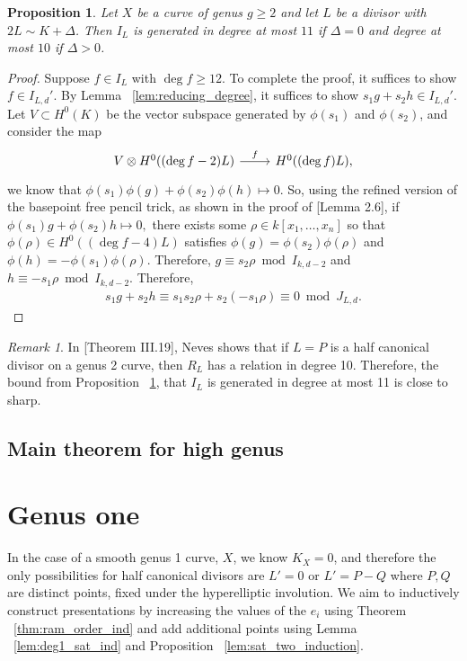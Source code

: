 \documentclass{amsart}
\theoremstyle{plain}
\newtheorem{prop}[thm]{Proposition}
\theoremstyle{definition}
\theoremstyle{remark}
\newtheorem{rem}[thm]{Remark}
\numberwithin{equation}{section}
\newcommand\ssec{\subsection}
\newcommand \halfcan{L}
\begin{document}
\begin{prop}
\label{prop:relations_generation}
Let $X$ be a curve of genus $g \geq 2$ and let $L$ be a divisor with $2L \sim K + \Delta$. Then $I_L$ is generated in degree at most $11$ if $\Delta = 0$ and degree at most $10$ if $\Delta > 0$.
\end{prop}
\begin{proof}
Suppose $f \in I_L$ with $\deg f \geq 12$. To complete the proof, it suffices to show $f \in I_{L,d}'$. By Lemma ~\ref{lem:reducing_degree}, it suffices to show $s_1g+s_2h \in I_{L,d}'$. 
Let $V \subset H^0(K)$ be the vector subspace generated by $\phi(s_1)$ and $\phi(s_2)$, and consider the map
$$\begin{tikzcd}
V \otimes H^0((\deg f - 2)L) \ar {r}{f} & H^0((\deg f)L),
\end{tikzcd}$$
we know that $\phi(s_1)\phi(g) + \phi(s_2) \phi(h) \mapsto 0.$
So, using the refined version of the basepoint free pencil trick, as shown in the proof of \cite{saint-donat:proj}[Lemma 2.6], if $\phi(s_1) g + \phi(s_2)h \mapsto 0,$ there exists some $\rho \in k[x_1, \ldots, x_n]$ so that $\phi(\rho) \in H^0((\deg f - 4)L)$ satisfies $\phi(g) = \phi(s_2)\phi(\rho)$ and $\phi(h) = -\phi(s_1)\phi(\rho).$ Therefore, $g \equiv s_2 \rho \bmod I_{k,d-2}$ and $h \equiv -s_1 \rho \bmod I_{k,d-2}$. Therefore,
\begin{align*}
	s_1g + s_2h \equiv s_1s_2\rho + s_2(-s_1 \rho) \equiv 0 \bmod J_{L,d}.
\end{align*}
\end{proof}

\begin{rem}
\label{rem:relations_generation_ten}
In \cite{neves:halfcan}[Theorem III.19], Neves shows that if $L=P$ is a half canonical divisor on a genus 2 curve, then $R_L$ has a relation in degree 10. Therefore, the bound from Proposition ~\ref{prop:relations_generation}, that $I_L$ is generated in degree at most 11 is close to sharp.
\end{rem}



\ssec{Main theorem for high genus}
\label{ssec:main_g_high}



\section{Genus one}
\label{sec:g_1}

In the case of a smooth genus 1 curve, $X$, we know $K_X = 0$, and therefore the only possibilities for half canonical divisors are $\halfcan' = 0$ or $\halfcan' = P-Q$ where $P,Q$ are distinct points, fixed under the hyperelliptic involution. We aim to inductively construct presentations by increasing the values of the $e_i$ using Theorem ~\ref{thm:ram_order_ind} and add additional points using Lemma ~\ref{lem:deg1_sat_ind} and Proposition ~\ref{lem:sat_two_induction}.
\end{document}
